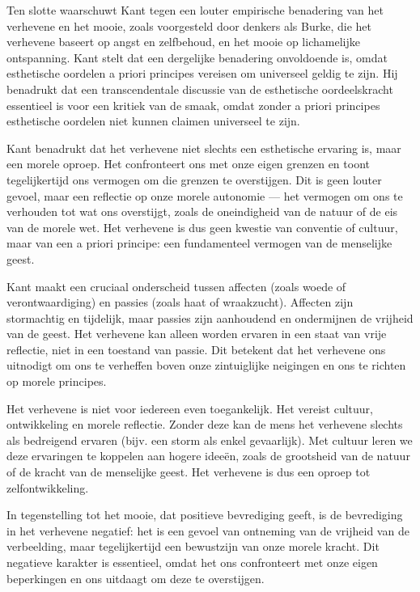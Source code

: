 \begin{mdframed}[leftmargin=0pt,rightmargin=0pt,backgroundcolor=blue!6,linecolor=white,innertopmargin=6pt,innerbottommargin=6pt]
Ten slotte waarschuwt Kant tegen een louter empirische benadering van het verhevene en het mooie, zoals voorgesteld door denkers als Burke, die het verhevene baseert op angst en zelfbehoud, en het mooie op lichamelijke ontspanning. Kant stelt dat een dergelijke benadering onvoldoende is, omdat esthetische oordelen a priori principes vereisen om universeel geldig te zijn. Hij benadrukt dat een transcendentale discussie van de esthetische oordeelskracht essentieel is voor een kritiek van de smaak, omdat zonder a priori principes esthetische oordelen niet kunnen claimen universeel te zijn.

\bigskip
Kant benadrukt dat het verhevene niet slechts een esthetische ervaring is, maar een morele oproep. Het confronteert ons met onze eigen grenzen en toont tegelijkertijd ons vermogen om die grenzen te overstijgen. Dit is geen louter gevoel, maar een reflectie op onze morele autonomie — het vermogen om ons te verhouden tot wat ons overstijgt, zoals de oneindigheid van de natuur of de eis van de morele wet. Het verhevene is dus geen kwestie van conventie of cultuur, maar van een a priori principe: een fundamenteel vermogen van de menselijke geest.

Kant maakt een cruciaal onderscheid tussen affecten (zoals woede of verontwaardiging) en passies (zoals haat of wraakzucht). Affecten zijn stormachtig en tijdelijk, maar passies zijn aanhoudend en ondermijnen de vrijheid van de geest. Het verhevene kan alleen worden ervaren in een staat van vrije reflectie, niet in een toestand van passie. Dit betekent dat het verhevene ons uitnodigt om ons te verheffen boven onze zintuiglijke neigingen en ons te richten op morele principes.

Het verhevene is niet voor iedereen even toegankelijk. Het vereist cultuur, ontwikkeling en morele reflectie. Zonder deze kan de mens het verhevene slechts als bedreigend ervaren (bijv. een storm als enkel gevaarlijk). Met cultuur leren we deze ervaringen te koppelen aan hogere ideeën, zoals de grootsheid van de natuur of de kracht van de menselijke geest. Het verhevene is dus een oproep tot zelfontwikkeling.

In tegenstelling tot het mooie, dat positieve bevrediging geeft, is de bevrediging in het verhevene negatief: het is een gevoel van ontneming van de vrijheid van de verbeelding, maar tegelijkertijd een bewustzijn van onze morele kracht. Dit negatieve karakter is essentieel, omdat het ons confronteert met onze eigen beperkingen en ons uitdaagt om deze te overstijgen.


\end{mdframed}
